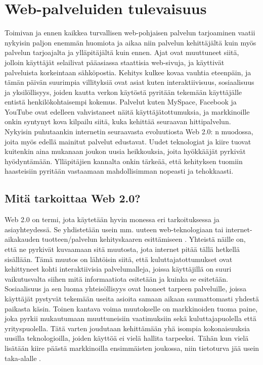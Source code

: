 
\chapter{Web-palveluiden tulevaisuus}

Toimivan ja ennen kaikkea turvallisen web-pohjaisen palvelun tarjoaminen vaatii
nykyisin paljon enemmän huomiota ja aikaa niin palvelun kehittäjältä kuin myös
palvelun tarjoajalta ja ylläpitäjältä kuin ennen. Ajat ovat muuttuneet siitä,
jolloin käyttäjät selailivat pääasiassa staattisia web-sivuja, ja käyttivät
palveluista korkeintaan sähköpostia. Kehitys kulkee kovaa vauhtia eteenpäin, ja
tämän päivän suurimpia villityksiä ovat asiat kuten interaktiivisuus,
sosiaalisuus ja yksilöllisyys, joiden kautta verkon käytöstä pyritään tekemään
käyttäjälle entistä henkilökohtaisempi kokemus. Palvelut kuten MySpace,
Facebook ja YouTube ovat edelleen vahvistaneet näitä käyttäjätottumuksia, ja
markkinoille onkin syntynyt kova kilpailu siitä, kuka kehittää seuraavan
hittipalvelun. Nykyisin puhutaankin internetin seuraavasta evoluutiosta Web 2.0:
n muodossa, joita myös edellä mainitut palvelut edustavat. Uudet teknologiat ja
kiire tuovat kuitenkin aina mukanaan joukon uusia heikkouksia, joita hyökkääjät
pyrkivät hyödyntämään. Ylläpitäjien kannalta onkin tärkeää, että kehityksen
tuomiin haasteisiin pyritään vastaamaan mahdollisimman nopeasti ja tehokkaasti.

\section{Mitä tarkoittaa Web 2.0?}

Web 2.0 on termi, jota käytetään hyvin monessa eri tarkoituksessa ja
asiayhteydessä. Se yhdistetään usein mm. uuteen web-teknologiaan tai internet-
aikakauden tuotteen/palvelun kehityskaaren esittämiseen \cite{WEB2}. Yhteistä näille
on, että ne pyrkivät kuvaamaan sitä muutosta, jota internet pitää tällä
hetkellä sisällään. Tämä muutos on lähtöisin siitä, että kuluttajatottumukset
ovat kehittyneet kohti interaktiivisia palvelumalleja, joissa käyttäjillä on
suuri vaikutusvalta siihen mitä informaatiota esitetään ja kuinka se esitetään.
Sosiaalisuus ja sen luoma yhteisöllisyys ovat luoneet tarpeen palveluille,
joissa käyttäjät pystyvät tekemään useita asioita samaan aikaan saumattomasti
yhdestä paikasta käsin. Toinen kantava voima muutokselle on markkinoiden tuoma
paine, joka pyrkii mukautumaan muuttuneisiin vaatimuksiin sekä
kuluttajapuolella että yrityspuolella. Tätä varten joudutaan kehittämään yhä
isompia kokonaisuuksia uusilla teknologioilla, joiden käyttöä ei vielä hallita
tarpeeksi. Tähän kun vielä lisätään kiire päästä markkinoilla ensimmäisten
joukossa, niin tietoturva jää usein taka-alalle \cite{WEB2b}.

